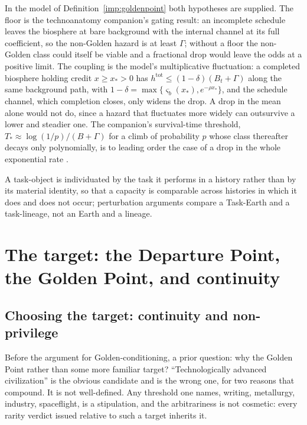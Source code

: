 \noindent In the model of Definition~\ref{imp:goldenpoint} both
hypotheses are supplied. The floor is the technoanatomy companion's
gating result: an incomplete schedule leaves the biosphere at bare
background with the internal channel at its full coefficient, so the
non-Golden hazard is at least $\Gamma$; without a floor the non-Golden
class could itself be viable and a fractional drop would leave the odds
at a positive limit. The coupling is the model's multiplicative
fluctuation: a completed biosphere holding credit $x\ge x_\ast>0$ has
$h^{\mathrm{tot}}\le(1-\delta)(B_t+\Gamma)$ along the same background
path, with $1-\delta=\max\{\varsigma_b(x_\ast),e^{-\rho x_\ast}\}$, and
the schedule channel, which completion closes, only widens the drop. A
drop in the mean alone would not do, since a hazard that fluctuates more
widely can outsurvive a lower and steadier one. The companion's
survival-time threshold, $T_\ast\approx\log(1/p)/(B+\Gamma)$ for a climb
of probability $p$ whose class thereafter decays only polynomially, is
to leading order the case of a drop in the whole exponential rate
\cite{GoldenTechnoanatomy}.

\begin{definition}
\label{imp:taskobject}
A task-object is individuated by the task it performs in a history rather
than by its material identity, so that a capacity is comparable across
histories in which it does and does not occur; perturbation arguments
compare a Task-Earth and a task-lineage, not an Earth and a lineage.
\end{definition}

\section{The target: the Departure Point, the Golden Point, and continuity}\label{sec:target}

\subsection{Choosing the target: continuity and non-privilege}\label{gc:sub:continuity}

Before the argument for Golden-conditioning, a prior question: why the
Golden Point rather than some more familiar target? ``Technologically
advanced civilization'' is the obvious candidate and is the wrong one,
for two reasons that compound. It is not well-defined. Any threshold one names, writing, metallurgy,
industry, spaceflight, is a stipulation, and the arbitrariness is not
cosmetic: every rarity verdict issued relative to such a target inherits
it.

